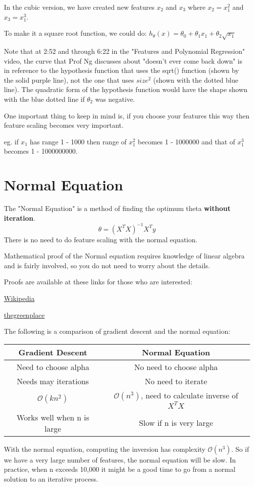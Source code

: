 In the cubic version, we have created new features $x_2$ and $x_3$ where $x_2 = x_1^2$ and $x_3 = x_1^3$.

To make it a square root function, we could do: $h_\theta(x) = \theta_0 + \theta_1 x_1 + \theta_2 \sqrt{x_1}$

Note that at 2:52 and through 6:22 in the "Features and Polynomial Regression" video, the curve that Prof Ng discusses about "doesn't ever come back down" is in reference to the hypothesis function that uses the sqrt() function (shown by the solid purple line), not the one that uses $size^2$ (shown with the dotted blue line). The quadratic form of the hypothesis function would have the shape shown with the blue dotted line if $\theta_2$ was negative.

One important thing to keep in mind is, if you choose your features this way then feature scaling becomes very important.

eg. if $x_1$ has range 1 - 1000 then range of $x_1^2$ becomes 1 - 1000000 and that of $x_1^3$ becomes 1 - 1000000000.
\section*{Normal Equation}
The "Normal Equation" is a method of finding the optimum theta {\bf without iteration}.
\begin{equation}
\theta=(X^TX)^{-1}X^Ty
\end{equation}
There is no need to do feature scaling with the normal equation.

Mathematical proof of the Normal equation requires knowledge of linear algebra and is fairly involved, so you do not need to worry about the details.

Proofs are available at these links for those who are interested:

\href{https://en.wikipedia.org/wiki/Linear_least_squares_(mathematics)}{Wikipedia}

\href{http://eli.thegreenplace.net/2014/derivation-of-the-normal-equation-for-linear-regression}{thegreenplace}

The following is a comparison of gradient descent and the normal equation:

\begin{center}
\begin{tabular}{|c|c|}
\hline 
{\bf Gradient Descent} & {\bf Normal Equation} \\ 
\hline 
Need to choose alpha & No need to choose alpha \\ 
\hline 
Needs may iterations & No need to iterate \\ 
\hline 
$\mathcal{O}(kn^2)$ & $\mathcal{O}(n^3)$, need to calculate inverse of $X^TX$ \\ 
\hline 
Works well when n is large & Slow if n is very large \\ 
\hline 
\end{tabular} 
\end{center}
With the normal equation, computing the inversion has complexity $\mathcal{O}(n^3)$. So if we have a very large number of features, the normal equation will be slow. In practice, when n exceeds 10,000 it might be a good time to go from a normal solution to an iterative process.
